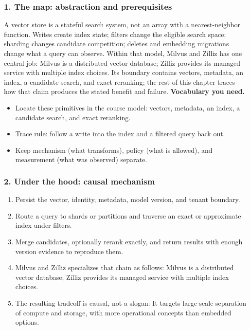 \subsubsection*{1. The map: abstraction and prerequisites}
A vector store is a stateful search system, not an array with a nearest-neighbor function. Writes create index state; filters change the eligible search space; sharding changes candidate competition; deletes and embedding migrations change what a query can observe.
Within that model, Milvus and Zilliz has one central job: Milvus is a distributed vector database; Zilliz provides its managed service with multiple index choices. Its boundary contains vectors, metadata, an index, a candidate search, and exact reranking; the rest of this chapter traces how that claim produces the stated benefit and failure.
\textbf{Vocabulary you need.}\begin{itemize}
\item Locate these primitives in the course model: vectors, metadata, an index, a candidate search, and exact reranking.
\item Trace rule: follow a write into the index and a filtered query back out.
\item Keep mechanism (what transforms), policy (what is allowed), and measurement (what was observed) separate.
\end{itemize}
\subsubsection*{2. Under the hood: causal mechanism}\begin{enumerate}
\item Persist the vector, identity, metadata, model version, and tenant boundary.
\item Route a query to shards or partitions and traverse an exact or approximate index under filters.
\item Merge candidates, optionally rerank exactly, and return results with enough version evidence to reproduce them.
\item Milvus and Zilliz specializes that chain as follows: Milvus is a distributed vector database; Zilliz provides its managed service with multiple index choices.
\item The resulting tradeoff is causal, not a slogan: It targets large-scale separation of compute and storage, with more operational concepts than embedded options.
\end{enumerate}
